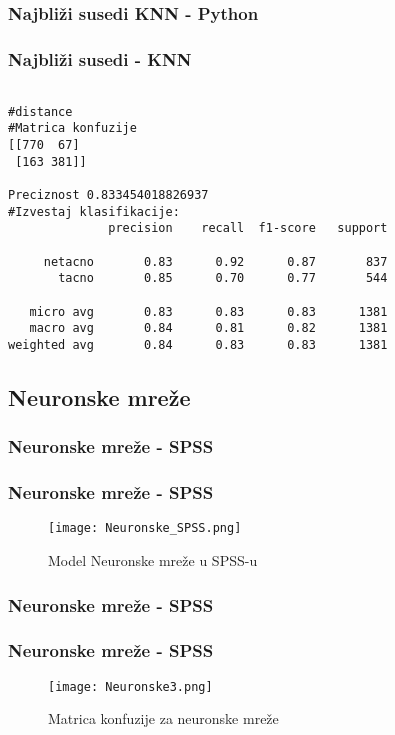 \documentclass{beamer}
\begin{document}
\subsubsection*{Najbliži susedi KNN - Python}
\begin{frame}[fragile]
\frametitle{Najbliži susedi - KNN}

\begin{lstlisting}

#distance
#Matrica konfuzije
[[770  67]
 [163 381]]

Preciznost 0.833454018826937
#Izvestaj klasifikacije:
              precision    recall  f1-score   support

     netacno       0.83      0.92      0.87       837
       tacno       0.85      0.70      0.77       544

   micro avg       0.83      0.83      0.83      1381
   macro avg       0.84      0.81      0.82      1381
weighted avg       0.84      0.83      0.83      1381
\end{lstlisting} 

\end{frame}

\subsection{Neuronske mreže}
\subsubsection*{Neuronske mreže - SPSS}
\begin{frame}[fragile]
\frametitle{Neuronske mreže - SPSS}

\begin{figure}
\begin{center}
\texttt{[image: Neuronske\_SPSS.png]}
\caption{Model Neuronske mreže u SPSS-u}
\end{center}
\end{figure}
\end{frame}

\subsubsection*{Neuronske mreže - SPSS}
\begin{frame}[fragile]
\frametitle{Neuronske mreže - SPSS}
\begin{figure}[ht!]
    \centering
    \texttt{[image: Neuronske3.png]}
    \caption{Matrica konfuzije za neuronske mreže}
    \label{fig:Neuronske3}
\end{figure}
\end{frame}
\end{document}
